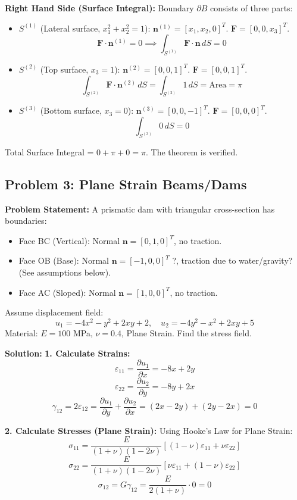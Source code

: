 \documentclass[10pt,twocolumn, a4paper]{article}
\begin{document}
\textbf{Right Hand Side (Surface Integral):}
Boundary $\partial B$ consists of three parts:
\begin{itemize}
    \item $S^{(1)}$ (Lateral surface, $x_1^2+x_2^2=1$): $\mathbf{n}^{(1)} = [x_1, x_2, 0]^T$. $\mathbf{F} = [0, 0, x_3]^T$.
    \[ \mathbf{F} \cdot \mathbf{n}^{(1)} = 0 \implies \int_{S^{(1)}} \mathbf{F} \cdot \mathbf{n} \, dS = 0 \]
    
    \item $S^{(2)}$ (Top surface, $x_3=1$): $\mathbf{n}^{(2)} = [0, 0, 1]^T$. $\mathbf{F} = [0, 0, 1]^T$.
    \[ \int_{S^{(2)}} \mathbf{F} \cdot \mathbf{n}^{(2)} \, dS = \int_{S^{(2)}} 1 \, dS = \text{Area} = \pi \]
    
    \item $S^{(3)}$ (Bottom surface, $x_3=0$): $\mathbf{n}^{(3)} = [0, 0, -1]^T$. $\mathbf{F} = [0, 0, 0]^T$.
    \[ \int_{S^{(3)}} 0 \, dS = 0 \]
\end{itemize}
Total Surface Integral = $0 + \pi + 0 = \pi$.
The theorem is verified.

\subsection{Problem 3: Plane Strain Beams/Dams}
\textbf{Problem Statement:}
A prismatic dam with triangular cross-section has boundaries:
\begin{itemize}
    \item Face BC (Vertical): Normal $\mathbf{n} = [0, 1, 0]^T$, no traction.
    \item Face OB (Base): Normal $\mathbf{n} = [-1, 0, 0]^T$ ?, traction due to water/gravity? (See assumptions below).
    \item Face AC (Sloped): Normal $\mathbf{n} = [1, 0, 0]^T$, no traction.
\end{itemize}
Assume displacement field:
\[ u_1 = -4x^2 - y^2 + 2xy + 2, \quad u_2 = -4y^2 - x^2 + 2xy + 5 \]
Material: $E=100$ MPa, $\nu=0.4$, Plane Strain. Find the stress field.

\textbf{Solution:}
\textbf{1. Calculate Strains:}
\[ \varepsilon_{11} = \frac{\partial u_1}{\partial x} = -8x + 2y \]
\[ \varepsilon_{22} = \frac{\partial u_2}{\partial y} = -8y + 2x \]
\[ \gamma_{12} = 2\varepsilon_{12} = \frac{\partial u_1}{\partial y} + \frac{\partial u_2}{\partial x} = (2x - 2y) + (2y - 2x) = 0 \]

\textbf{2. Calculate Stresses (Plane Strain):}
Using Hooke's Law for Plane Strain:
\[ \sigma_{11} = \frac{E}{(1+\nu)(1-2\nu)} [(1-\nu)\varepsilon_{11} + \nu\varepsilon_{22}] \]
\[ \sigma_{22} = \frac{E}{(1+\nu)(1-2\nu)} [\nu\varepsilon_{11} + (1-\nu)\varepsilon_{22}] \]
\[ \sigma_{12} = G \gamma_{12} = \frac{E}{2(1+\nu)} \cdot 0 = 0 \]
\end{document}
